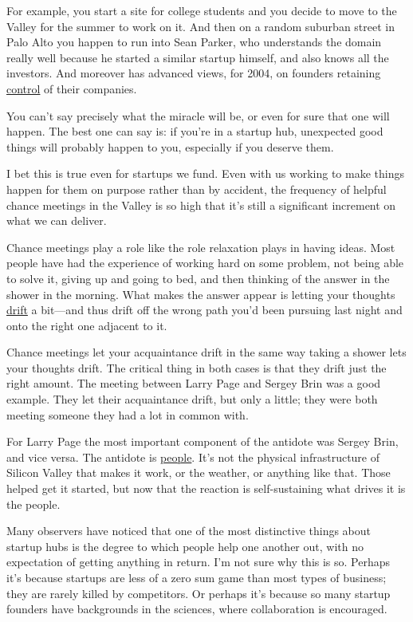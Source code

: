 For example, you start a site for college students and you decide to
move to the Valley for the summer to work on it. And then on a random
suburban street in Palo Alto you happen to run into Sean Parker, who
understands the domain really well because he started a similar startup
himself, and also knows all the investors. And moreover has advanced
views, for 2004, on founders retaining \href{control.html}{control} of
their companies.

You can't say precisely what the miracle will be, or even for sure that
one will happen. The best one can say is: if you're in a startup hub,
unexpected good things will probably happen to you, especially if you
deserve them.

I bet this is true even for startups we fund. Even with us working to
make things happen for them on purpose rather than by accident, the
frequency of helpful chance meetings in the Valley is so high that it's
still a significant increment on what we can deliver.

Chance meetings play a role like the role relaxation plays in having
ideas. Most people have had the experience of working hard on some
problem, not being able to solve it, giving up and going to bed, and
then thinking of the answer in the shower in the morning. What makes the
answer appear is letting your thoughts \href{top.html}{drift} a
bit---and thus drift off the wrong path you'd been pursuing last night
and onto the right one adjacent to it.

Chance meetings let your acquaintance drift in the same way taking a
shower lets your thoughts drift. The critical thing in both cases is
that they drift just the right amount. The meeting between Larry Page
and Sergey Brin was a good example. They let their acquaintance drift,
but only a little; they were both meeting someone they had a lot in
common with.

For Larry Page the most important component of the antidote was Sergey
Brin, and vice versa. The antidote is \href{siliconvalley.html}{people}.
It's not the physical infrastructure of Silicon Valley that makes it
work, or the weather, or anything like that. Those helped get it
started, but now that the reaction is self-sustaining what drives it is
the people.

Many observers have noticed that one of the most distinctive things
about startup hubs is the degree to which people help one another out,
with no expectation of getting anything in return. I'm not sure why this
is so. Perhaps it's because startups are less of a zero sum game than
most types of business; they are rarely killed by competitors. Or
perhaps it's because so many startup founders have backgrounds in the
sciences, where collaboration is encouraged.

